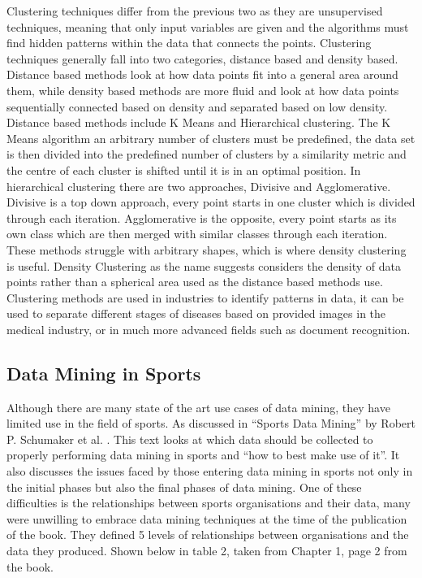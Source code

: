 \documentclass{imc-inf}
\begin{document}
	Clustering techniques differ from the previous two as they are unsupervised techniques, meaning that only input variables are given and the algorithms must find hidden patterns within the data that connects the points. Clustering techniques generally fall into two categories, distance based and density based. Distance based methods look at how data points fit into a general area around them, while density based methods are more fluid and look at how data points sequentially connected based on density and separated based on low density. Distance based methods include K Means and Hierarchical clustering. The K Means algorithm an arbitrary number of clusters must be predefined, the data set is then divided into the predefined number of clusters by a similarity metric and the centre of each cluster is shifted until it is in an optimal position. In hierarchical clustering there are two approaches, Divisive and Agglomerative. Divisive is a top down approach, every point starts in one cluster which is divided through each iteration. Agglomerative is the opposite, every point starts as its own class which are then merged with similar classes through each iteration. These methods struggle with arbitrary shapes, which is where density clustering is useful. Density Clustering as the name suggests considers the density of data points rather than a spherical area used as the distance based methods use. Clustering methods are used in industries to identify patterns in data, it can be used to separate different stages of diseases based on provided images \cite{SOTA} in the medical industry, or in much more advanced fields such as document recognition.
	
	\subsection{Data Mining in Sports}
	Although there are many state of the art use cases of data mining, they have limited use in the field of sports. As discussed in “Sports Data Mining” by Robert P. Schumaker et al. \cite{SportDM}. This text looks at which data should be collected to properly performing data mining in sports and “how to best make use of it”. It also discusses the issues faced by those entering data mining in sports not only in the initial phases but also the final phases of data mining. One of these difficulties is the relationships between sports organisations and their data, many were unwilling to embrace data mining techniques at the time of the publication of the book. They defined 5 levels of relationships between organisations and the data they produced. Shown below in table 2, taken from Chapter 1, page 2 from the book.
	
\end{document}
